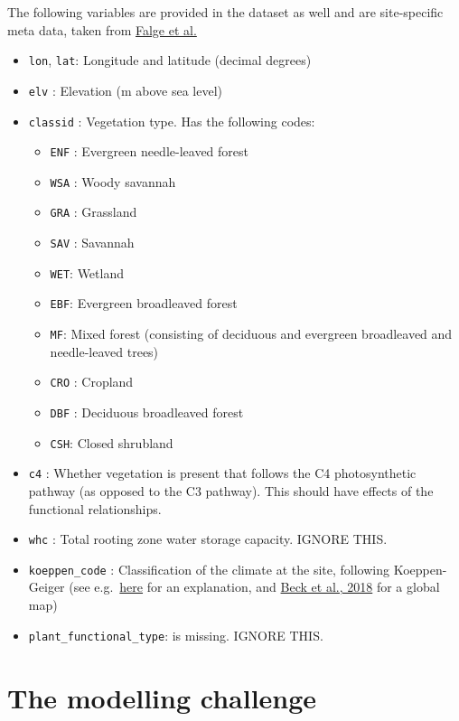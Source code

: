 \documentclass[
]{book}
\providecommand{\tightlist}{%
  \setlength{\itemsep}{0pt}\setlength{\parskip}{0pt}}
\begin{document}
The following variables are provided in the dataset as well and are site-specific meta data, taken from \href{https://daac.ornl.gov/cgi-bin/dsviewer.pl?ds_id=1530}{Falge et al.}

\begin{itemize}
\tightlist
\item
  \texttt{lon}, \texttt{lat}: Longitude and latitude (decimal degrees)
\item
  \texttt{elv} : Elevation (m above sea level)
\item
  \texttt{classid} : Vegetation type. Has the following codes:

  \begin{itemize}
  \tightlist
  \item
    \texttt{ENF} : Evergreen needle-leaved forest
  \item
    \texttt{WSA} : Woody savannah
  \item
    \texttt{GRA} : Grassland
  \item
    \texttt{SAV} : Savannah
  \item
    \texttt{WET}: Wetland
  \item
    \texttt{EBF}: Evergreen broadleaved forest
  \item
    \texttt{MF}: Mixed forest (consisting of deciduous and evergreen broadleaved and needle-leaved trees)
  \item
    \texttt{CRO} : Cropland
  \item
    \texttt{DBF} : Deciduous broadleaved forest
  \item
    \texttt{CSH}: Closed shrubland
  \end{itemize}
\item
  \texttt{c4} : Whether vegetation is present that follows the C4 photosynthetic pathway (as opposed to the C3 pathway). This should have effects of the functional relationships.
\item
  \texttt{whc} : Total rooting zone water storage capacity. IGNORE THIS.
\item
  \texttt{koeppen\_code} : Classification of the climate at the site, following Koeppen-Geiger (see e.g.~\href{https://en.wikipedia.org/wiki/K\%C3\%B6ppen_climate_classification}{here} for an explanation, and \href{https://www.nature.com/articles/sdata2018214}{Beck et al., 2018} for a global map)
\item
  \texttt{plant\_functional\_type}: is missing. IGNORE THIS.
\end{itemize}

\hypertarget{the-modelling-challenge}{%
\section{The modelling challenge}\label{the-modelling-challenge}}
\end{document}

